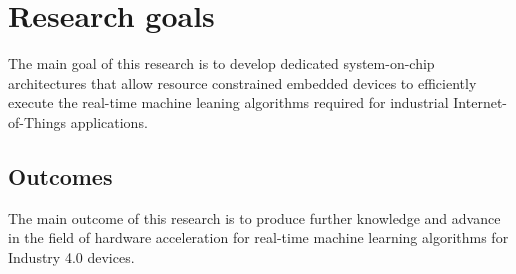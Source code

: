 \section{Research goals}
The main goal of this research is to develop dedicated system-on-chip architectures that allow resource constrained embedded devices to efficiently execute the real-time machine leaning algorithms required for industrial Internet-of-Things applications.
\subsection{Outcomes}
The main outcome of this research is to produce further knowledge and advance in the field of hardware acceleration for real-time machine learning algorithms for Industry 4.0 devices.

\pagebreak